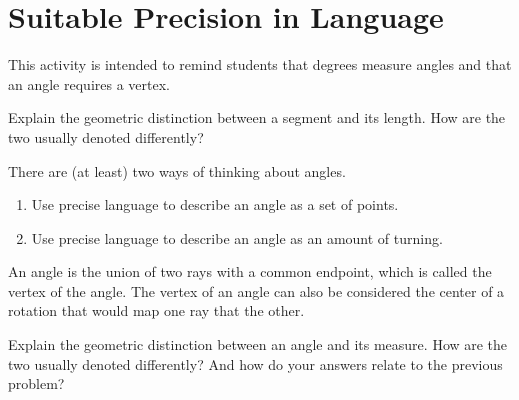 \newpage
\section{Suitable Precision in Language}


\begin{teachingnote}
This activity is intended to remind students that degrees measure angles and that an angle requires a vertex. 
\end{teachingnote}

\begin{prob}
Explain the geometric distinction between a segment and its length.  How are the two usually denoted differently?  
\end{prob}
\vspace{.4in}

\begin{prob}
There are (at least) two ways of thinking about angles.  
\begin{enumerate}
\item Use precise language to describe an angle as a set of points.  
\vspace{.4in}
\item Use precise language to describe an angle as an amount of turning.  
\end{enumerate}
\vspace{.4in}
\end{prob}
\begin{teachingnote}
An angle is the union of two rays with a common endpoint, which is called the vertex of the angle.  The vertex of an angle can also be considered the center of a rotation that would map one ray that the other.  
\end{teachingnote}

\begin{prob}
Explain the geometric distinction between an angle and its measure.  How are the two usually denoted differently?  And how do your answers relate to the previous problem?  
\end{prob}
\vspace{.8in}

